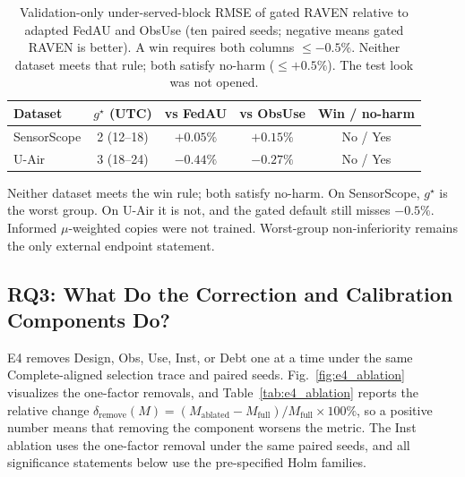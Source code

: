 \documentclass[letterpaper,journal]{IEEEtran}
\begin{document}
\begin{table}[t]
\centering
\caption{Validation-only under-served-block RMSE of gated RAVEN relative
to adapted FedAU and ObsUse (ten paired seeds; negative means gated
RAVEN is better).  A win requires both columns $\le-0.5\%$.  Neither
dataset meets that rule; both satisfy no-harm ($\le+0.5\%$).  The test
look was not opened.}
\label{tab:underserved_block}
\setlength{\tabcolsep}{3.5pt}
\begin{tabular}{lcccc}
\toprule
Dataset & $g^{\star}$ (UTC) & vs FedAU & vs ObsUse & Win / no-harm\\
\midrule
SensorScope & 2 (12--18) & $+0.05\%$ & $+0.15\%$ & No / Yes\\
U-Air & 3 (18--24) & $-0.44\%$ & $-0.27\%$ & No / Yes\\
\bottomrule
\end{tabular}
\end{table}

Neither dataset meets the win rule; both satisfy no-harm.
On SensorScope, $g^{\star}$ is the worst group.  On U-Air it is not, and
the gated default still misses $-0.5\%$.  Informed $\mu$-weighted copies
were not trained.  Worst-group non-inferiority remains the only external
endpoint statement.

\subsection{RQ3: What Do the Correction and Calibration Components Do?}
\label{subsec:eval_rq3}

E4 removes Design, Obs, Use, Inst, or Debt one at a time under the same
Complete-aligned selection trace and paired seeds.  Fig.~\ref{fig:e4_ablation}
visualizes the one-factor removals, and Table~\ref{tab:e4_ablation}
reports the relative change
$\delta_{\mathrm{remove}}(M)
=(M_{\mathrm{ablated}}-M_{\mathrm{full}})/M_{\mathrm{full}}\times100\%$,
so a positive number means that removing the component worsens the metric.
The Inst ablation uses the one-factor removal under the same paired seeds, and
all significance statements below use the pre-specified Holm families.
\end{document}
